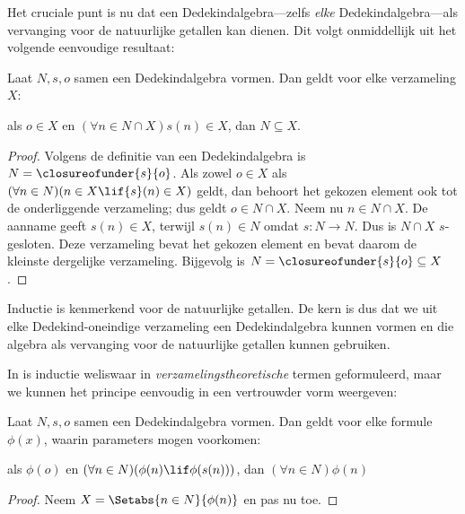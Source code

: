 \documentclass[openany]{memoir}
\begin{document}

Het cruciale punt is nu dat een Dedekindalgebra---zelfs \emph{elke}
Dedekindalgebra---als vervanging voor de natuurlijke getallen kan
dienen. Dit volgt onmiddellijk uit het volgende eenvoudige resultaat:

\begin{thm}
Laat $N, s, o$ samen een Dedekindalgebra vormen. Dan geldt voor elke
verzameling $X$:
	\begin{center}
		als $o \in X$ en $(\forall {n} \in N \cap X){s}({n}) \in X$, {dan} $N \subseteq X$.
	\end{center}
\end{thm}

\begin{proof}
Volgens de definitie van een Dedekindalgebra is $N =
\closureofunder{s}{o}$. Als zowel ${o} \in X$ als $(\forall {n} \in
N)(n \in X \lif {s}({n}) \in X)$ geldt, dan behoort het gekozen
element ook tot de onderliggende verzameling; dus geldt ${o} \in N
\cap X$. Neem nu ${n} \in N \cap X$. De aanname geeft
${s}({n}) \in X$, terwijl
${s}({n}) \in N$ omdat $s \colon N \to N$. Dus is $N \cap X$
$s$-gesloten. Deze verzameling bevat het gekozen element en bevat
daarom de kleinste dergelijke verzameling. Bijgevolg is $N =
\closureofunder{s}{o} \subseteq X$.
\end{proof}

Inductie is kenmerkend voor de natuurlijke getallen. De kern is dus dat
we uit elke Dedekind-oneindige verzameling een Dedekindalgebra kunnen
vormen en die algebra als vervanging voor de natuurlijke getallen
kunnen gebruiken.

In  is inductie weliswaar in
\emph{verzamelingstheoretische} termen geformuleerd, maar we kunnen
het principe eenvoudig in een vertrouwder vorm weergeven:

\begin{cor}
Laat $N, s, o$ samen een Dedekindalgebra vormen. Dan geldt voor elke
formule $\phi(x)$, waarin parameters mogen voorkomen:
\begin{center}
	als $\phi(o)$ en $(\forall {n} \in N)(\phi(n)\lif
	\phi({s}({n})))$, {dan} $(\forall n \in N)\phi(n)$
\end{center}
\end{cor}

\begin{proof}
Neem $X = \Setabs{n \in N}{\phi(n)}$ en pas nu
 toe.
\end{proof}
\end{document}
